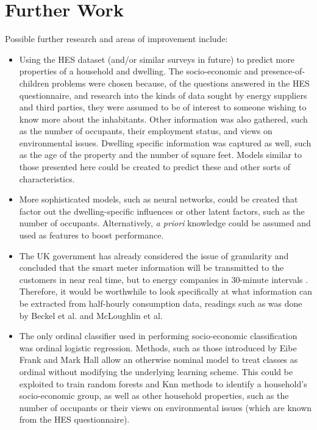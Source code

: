 \section{Further Work}
Possible further research and areas of improvement include:
\begin{itemize}

\item Using the HES dataset (and/or similar surveys in future) to predict more properties of a household and dwelling. The socio-economic and presence-of-children problems were chosen because, of the questions answered in the HES questionnaire, and research into the kinds of data sought by energy suppliers and third parties, they were assumed to be of interest to someone wishing to know more about the inhabitants. Other information was also gathered, such as the number of occupants, their employment status, and views on environmental issues. Dwelling specific information was captured as well, such as the age of the property and the number of square feet. Models similar to those presented here could be created to predict these and other sorts of characteristics.

\item More sophisticated models, such as neural networks, could be created that factor out the dwelling-specific influences or other latent factors, such as the number of occupants. Alternatively, \textit{a priori} knowledge could be assumed and used as features to boost performance.

\item The UK government has already considered the issue of granularity and concluded that the smart meter information will be transmitted to the customers in near real time, but to energy companies in 30-minute intervals \cite{DECC_1}.  Therefore, it would be worthwhile to look specifically at what information can be extracted from half-hourly consumption data, readings such as was done by Beckel et al. and McLoughlin et al.\cite{Beckel_2, McLoughlin}

\item The only ordinal classifier used in performing socio-economic classification was ordinal logistic regression. Methods, such as those introduced by Eibe Frank and Mark Hall \cite{Frank} allow an otherwise nominal model to treat classes as ordinal without modifying the underlying learning scheme. This could be exploited to train random forests and Knn methods to identify a household's socio-economic group, as well as other household properties, such as the number of occupants or their views on environmental issues (which are known from the HES questionnaire).
\end{itemize}
